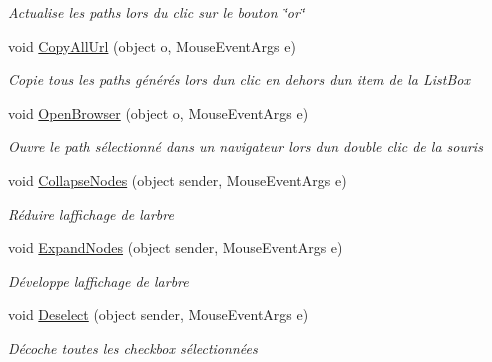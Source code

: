 \begin{DoxyCompactItemize}
\begin{DoxyCompactList}\small\item\em Actualise les paths lors du clic sur le bouton \char`\"{}or\char`\"{} \end{DoxyCompactList}\item 
void \mbox{\hyperlink{class_m_t_connect_agent_1_1_user_control_display_tab_ac473c5026d9d7af94210c53170be841b}{Copy\+All\+Url}} (object o, Mouse\+Event\+Args e)
\begin{DoxyCompactList}\small\item\em Copie tous les paths générés lors d\textquotesingle{}un clic en dehors d\textquotesingle{}un item de la List\+Box \end{DoxyCompactList}\item 
void \mbox{\hyperlink{class_m_t_connect_agent_1_1_user_control_display_tab_a35c3095a47ee602da98eca8e77e6ff3b}{Open\+Browser}} (object o, Mouse\+Event\+Args e)
\begin{DoxyCompactList}\small\item\em Ouvre le path sélectionné dans un navigateur lors d\textquotesingle{}un double clic de la souris \end{DoxyCompactList}\item 
void \mbox{\hyperlink{class_m_t_connect_agent_1_1_user_control_display_tab_a9e5f7105041510bae0e1da721a7bc4c3}{Collapse\+Nodes}} (object sender, Mouse\+Event\+Args e)
\begin{DoxyCompactList}\small\item\em Réduire l\textquotesingle{}affichage de l\textquotesingle{}arbre \end{DoxyCompactList}\item 
void \mbox{\hyperlink{class_m_t_connect_agent_1_1_user_control_display_tab_a3b3bc198b2518ec65b3b2dba371d6f83}{Expand\+Nodes}} (object sender, Mouse\+Event\+Args e)
\begin{DoxyCompactList}\small\item\em Développe l\textquotesingle{}affichage de l\textquotesingle{}arbre \end{DoxyCompactList}\item 
void \mbox{\hyperlink{class_m_t_connect_agent_1_1_user_control_display_tab_a1913b7cb8611c0670e08abaf6e20352d}{Deselect}} (object sender, Mouse\+Event\+Args e)
\begin{DoxyCompactList}\small\item\em Décoche toutes les checkbox sélectionnées \end{DoxyCompactList}\item 

\end{DoxyCompactItemize}
